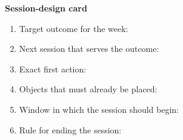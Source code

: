 \begin{templatebox}
\textbf{Session-design card}
\begin{enumerate}[nosep]
  \item Target outcome for the week:
  \item Next session that serves the outcome:
  \item Exact first action:
  \item Objects that must already be placed:
  \item Window in which the session should begin:
  \item Rule for ending the session:
\end{enumerate}
\end{templatebox}
